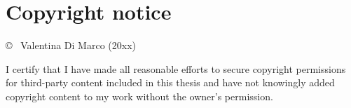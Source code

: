 \section*{Copyright notice}

\vspace{1cm}

{
  \copyright ~ Valentina Di Marco (20xx)
}

\vspace{1cm}

{
  I certify that I have made all reasonable efforts to secure
  copyright permissions for third-party content included in this
  thesis and have not knowingly added copyright content to my work
  without the owner's permission.
}

